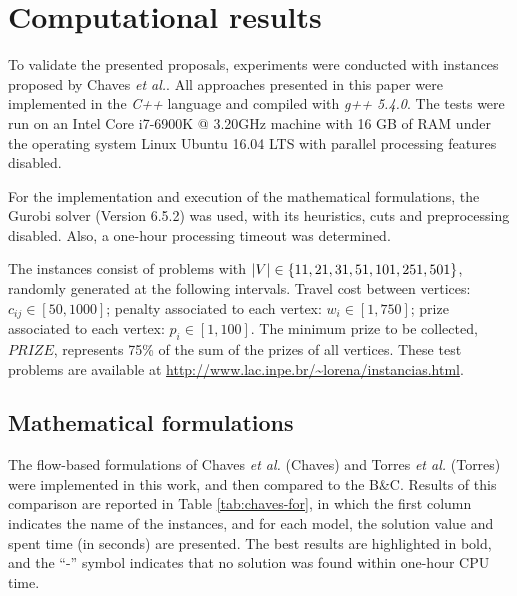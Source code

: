 \documentclass{ro}
\begin{document}
\section{Computational results}
\label{sec:results}	

To validate the presented proposals, experiments were conducted with instances proposed by Chaves \textit{et al.}\cite{chaves2005hybrid}. All approaches presented in this paper were implemented in the \textit{C++} language and compiled with \textit{g++ 5.4.0}. The tests were run on an Intel Core i7-6900K @ 3.20GHz machine with 16 GB of RAM under the operating system Linux Ubuntu 16.04
LTS with parallel processing features disabled.


For the implementation and execution of the mathematical formulations, the Gurobi solver (Version 6.5.2) was used, with its heuristics, cuts and preprocessing disabled. Also, a one-hour processing timeout was determined.



The instances  consist of problems with $ |V| \in \{11,21,31,51,\- 101, 251, 501\}$, randomly generated at the following intervals. Travel cost between vertices:  $c_{ij} \in [50,1000]$; penalty associated to each vertex:  $w_i \in [1,750]$; prize associated to each vertex: $p_i \in [1,100]$. The minimum prize to be collected,  $PRIZE$, represents 75\% of the sum of the prizes of all vertices. These test problems are available at \url{http://www.lac.inpe.br/~lorena/instancias.html}.

\subsection{Mathematical formulations}

%

The flow-based formulations of Chaves \textit{et al.} \cite{chaves2005hybrid} (Chaves) and Torres \textit{et al.} \cite{torres2003problemas} (Torres) were implemented in this work, and then compared to the B\&C. Results of this comparison are reported in Table \ref{tab:chaves-for}, in which the first column indicates the name of the instances, and for each model, the solution value and spent time (in seconds) are presented. The best results are highlighted in bold, and the ``-'' symbol indicates that no solution was found within one-hour CPU time.
\end{document}
